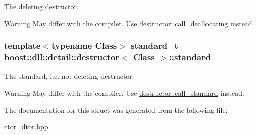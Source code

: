 The deleting destructor. 

\begin{DoxyWarning}{Warning}
May differ with the compiler. Use destructor\+::call\+\_\+deallocating instead. 
\end{DoxyWarning}
\subsubsection[{\texorpdfstring{standard}{standard}}]{\setlength{\rightskip}{0pt plus 5cm}template$<$typename Class$>$ standard\+\_\+t {\bf boost\+::dll\+::detail\+::destructor}$<$ Class $>$\+::standard}\hypertarget{a00076_a5c588780f2142ca3492ea78c62fe472c}{}\label{a00076_a5c588780f2142ca3492ea78c62fe472c}


The standard, i.\+e. not deleting destructor. 

\begin{DoxyWarning}{Warning}
May differ with the compiler. Use \hyperlink{a00076_a95d55018849080c7d4c771b564e9b04e}{destructor\+::call\+\_\+standard} instead. 
\end{DoxyWarning}


The documentation for this struct was generated from the following file\+:\begin{DoxyCompactItemize}
\item 
ctor\+\_\+dtor.\+hpp\end{DoxyCompactItemize}
